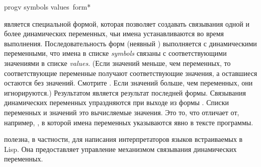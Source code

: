 \begin{defspec}
progv symbols values {\,form}*

 является специальной формой, которая позволяет создавать связывания
одной и более динамических переменных, чьи имена устанавливаются во время
выполнения. Последовательность форм (неявный )
выполняется с динамическими переменными, что имена в списке \emph{symbols}
связаны с соответствующими значениями в списке \emph{values}.
(Если значений меньше, чем переменных, то соответствующие переменные получают
соответствующие значения, а оставшиеся остаются без значений. Смотрите
. Если значений больше, чем переменных, они игнорируются.)
Результатом  является результат последней формы. Связывания
динамических переменных упраздняются при выходе из формы . Списки
переменных и значений это вычисляемые значения. Это то, что отличает 
от, например, , в которой имена переменных указываются явно в тексте
программы.

 полезна, в частности, для написания интерпретаторов языков
встраиваемых в Lisp. Она предоставляет управление механизмом связывания
динамических переменных.
\end{defspec}


